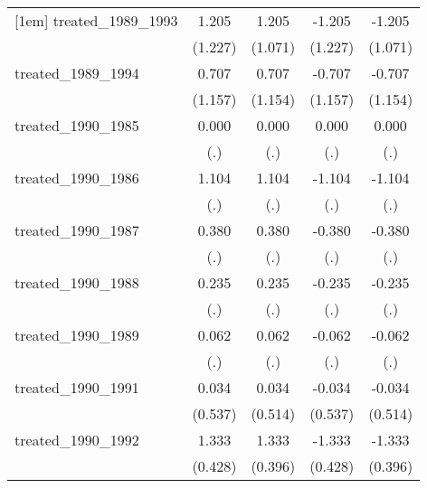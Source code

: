 {\begin{tabular}{l*{4}{c}}
[1em]
treated\_1989\_1993&       1.205         &       1.205         &      -1.205         &      -1.205         \\
            &     (1.227)         &     (1.071)         &     (1.227)         &     (1.071)         \\
[1em]
treated\_1989\_1994&       0.707         &       0.707         &      -0.707         &      -0.707         \\
            &     (1.157)         &     (1.154)         &     (1.157)         &     (1.154)         \\
[1em]
treated\_1990\_1985&       0.000         &       0.000         &       0.000         &       0.000         \\
            &         (.)         &         (.)         &         (.)         &         (.)         \\
[1em]
treated\_1990\_1986&       1.104         &       1.104         &      -1.104         &      -1.104         \\
            &         (.)         &         (.)         &         (.)         &         (.)         \\
[1em]
treated\_1990\_1987&       0.380         &       0.380         &      -0.380         &      -0.380         \\
            &         (.)         &         (.)         &         (.)         &         (.)         \\
[1em]
treated\_1990\_1988&       0.235         &       0.235         &      -0.235         &      -0.235         \\
            &         (.)         &         (.)         &         (.)         &         (.)         \\
[1em]
treated\_1990\_1989&       0.062         &       0.062         &      -0.062         &      -0.062         \\
            &         (.)         &         (.)         &         (.)         &         (.)         \\
[1em]
treated\_1990\_1991&       0.034         &       0.034         &      -0.034         &      -0.034         \\
            &     (0.537)         &     (0.514)         &     (0.537)         &     (0.514)         \\
[1em]
treated\_1990\_1992&       1.333\sym{**} &       1.333\sym{***}&      -1.333\sym{**} &      -1.333\sym{***}\\
            &     (0.428)         &     (0.396)         &     (0.428)         &     (0.396)         \\

\end{tabular}}
